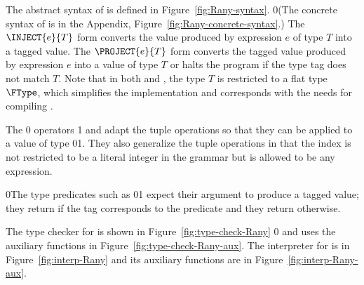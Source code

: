 \documentclass[7x10,nocrop]{TimesAPriori_MIT}%
\def\racketEd{0}
\def\pythonEd{1}
\def\edition{0}
\newcommand{\racket}[1]{{\if\edition\racketEd{#1}\fi}}
\newcommand{\python}[1]{{\if\edition\pythonEd #1\fi}}
\begin{document}
The abstract syntax of \LangAny{} is defined in Figure~\ref{fig:Rany-syntax}.
\racket{(The concrete syntax of \LangAny{} is in the Appendix,
Figure~\ref{fig:Rany-concrete-syntax}.)}  The $\INJECT{e}{T}$ form
converts the value produced by expression $e$ of type $T$ into a
tagged value.  The $\PROJECT{e}{T}$ form converts the tagged value
produced by expression $e$ into a value of type $T$ or halts the
program if the type tag does not match $T$.
%
Note that in both  and , the type $T$ is
restricted to a flat type $\FType$, which simplifies the
implementation and corresponds with the needs for compiling \LangDyn{}.

The \racket{} operators
\python{ and }
adapt the tuple operations so that they can be applied to a value of
type \racket{}\python{}.  They also generalize the
tuple operations in that the index is not restricted to be a literal
integer in the grammar but is allowed to be any expression.

\racket{The type predicates such as
\racket{}\python{\key{is\_bool}} expect their argument
to produce a tagged value; they return  {\TRUE} if the tag corresponds to
the predicate and they return {\FALSE} otherwise.}

The type checker for \LangAny{} is shown in
Figure~\ref{fig:type-check-Rany}
%
\racket{ and uses the auxiliary functions in
Figure~\ref{fig:type-check-Rany-aux}}.
%
The interpreter for \LangAny{} is in Figure~\ref{fig:interp-Rany} and
its auxiliary functions are in Figure~\ref{fig:interp-Rany-aux}.
\end{document}
